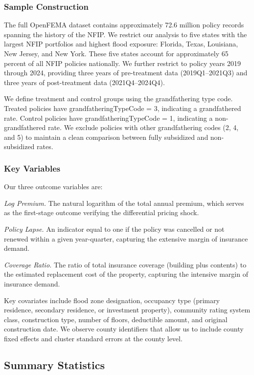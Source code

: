 \documentclass[12pt]{article}
\begin{document}
\subsubsection*{Sample Construction} The full OpenFEMA dataset contains approximately 72.6 million policy records spanning the history of the NFIP. We restrict our analysis to five states with the largest NFIP portfolios and highest flood exposure: Florida, Texas, Louisiana, New Jersey, and New York. These five states account for approximately 65 percent of all NFIP policies nationally. We further restrict to policy years 2019 through 2024, providing three years of pre-treatment data (2019Q1--2021Q3) and three years of post-treatment data (2021Q4--2024Q4).

We define treatment and control groups using the grandfathering type code. Treated policies have grandfatheringTypeCode = 3, indicating a grandfathered rate. Control policies have grandfatheringTypeCode = 1, indicating a non-grandfathered rate. We exclude policies with other grandfathering codes (2, 4, and 5) to maintain a clean comparison between fully subsidized and non-subsidized rates.

\subsubsection*{Key Variables} Our three outcome variables are:

\textit{Log Premium.} The natural logarithm of the total annual premium, which serves as the first-stage outcome verifying the differential pricing shock.

\textit{Policy Lapse.} An indicator equal to one if the policy was cancelled or not renewed within a given year-quarter, capturing the extensive margin of insurance demand.

\textit{Coverage Ratio.} The ratio of total insurance coverage (building plus contents) to the estimated replacement cost of the property, capturing the intensive margin of insurance demand.

Key covariates include flood zone designation, occupancy type (primary residence, secondary residence, or investment property), community rating system class, construction type, number of floors, deductible amount, and original construction date. We observe county identifiers that allow us to include county fixed effects and cluster standard errors at the county level.

\subsection{Summary Statistics}
\end{document}
